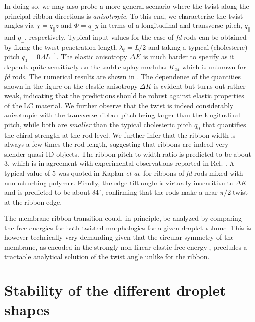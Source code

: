 In doing so, we may also probe a more general scenario where the twist along the principal ribbon directions is {\em anisotropic}. To this end, we characterize  the twist angles  via $\chi = q_{\parallel} z$ and $\Phi = q_{\perp}y$ in terms of a longitudinal and transverse pitch, $q_{\parallel}$ and $q_{\perp}$, respectively. 
 Typical input values  for the case of {\em fd} rods can be obtained by fixing the twist penetration length $\lambda_{t}  = L/2$ \cite{barry_jpcb2009} and taking a typical (cholesteric) pitch $q_{0} = 0.4L^{-1}$. The elastic anisotropy $\Delta K$ is much harder to specify as it depends quite sensitively on the  saddle-splay modulus $K_{24}$ which is unknown for {\em fd} rods. 
The numerical results are shown in . The dependence of the quantities shown in the figure on the elastic anisotropy $\Delta K $ is evident but turns out rather weak, indicating that the predictions should be robust against elastic properties of the LC material.   We further observe that the twist is indeed considerably anisotropic with the transverse ribbon pitch being larger than  the longitudinal pitch, while both are {\em smaller} than the typical cholesteric pitch $q_{0}$ that quantifies the chiral strength at the rod level. We further infer that the ribbon width is always a few times the rod length, suggesting that ribbons are indeed very slender quasi-1D  objects. The ribbon pitch-to-width ratio is predicted to be about 3, which is in agreement with experimental observations reported in Ref. \cite{Gibaud2012}. A typical value of 5 was quoted in Kaplan {\em et al.} \cite{kaplan2010theory}  for ribbons of {\em fd} rods mixed with non-adsorbing polymer.   Finally, the edge tilt angle is virtually insensitive to $\Delta K$ and is predicted to be about $84 ^\circ$, confirming that the rods make a near  $\pi/2$-twist at the ribbon edge.


The membrane-ribbon transition   could, in principle, be analyzed by comparing the free energies for both twisted morphologies for a given droplet volume. This is however technically very demanding given that the circular symmetry of the membrane, as encoded in the strongly non-linear elastic free energy ,  precludes a tractable analytical solution of the twist angle unlike for the ribbon. 
 
\section{Stability of the different droplet shapes}


